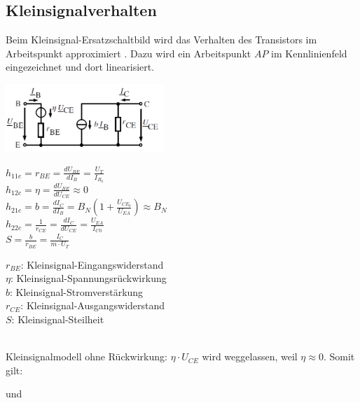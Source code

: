 	\subsection{Kleinsignalverhalten}
		Beim Kleinsignal-Ersatzschaltbild wird das Verhalten des Transistors im Arbeitspunkt
		approximiert . Dazu wird ein Arbeitspunkt $AP$ im Kennlinienfeld eingezeichnet
		und dort linearisiert. \\
		\begin{minipage}[c]{6cm}
			\includegraphics[width=6cm]{images/bip-kleinsignal}
		\end{minipage}
		\begin{minipage}[c]{6cm}
			$h_{11e} = r_{BE} = \frac{dU_{BE}}{dI_{B}} = \frac{U_T}{I_{B_0}}$ \\
			$h_{12e} = \eta = \frac{dU_{BE}}{dU_{CE}} \approx 0$ \\
			$h_{21e} = b = \frac{dI_C}{dI_B} = B_N(1+\frac{U_{CE_0}}{U_{EA}}) \approx B_N$ \\
			$h_{22e} = \frac{1}{r_{CE}} = \frac{dI_C}{dU_{CE}} = \frac{U_{EA}}{I_{C0}}$ \\
			$S = \frac{b}{r_{BE}} = \frac{I_C}{m \cdot U_T}$
		\end{minipage}
		\begin{minipage}[c]{6cm}
			$r_{BE}$: Kleinsignal-Eingangswiderstand \\
			$\eta$: Kleinsignal-Spannungsrückwirkung \\
			$b$: Kleinsignal-Stromverstärkung \\
			$r_{CE}$: Kleinsignal-Ausgangswiderstand \\
			$S$: Kleinsignal-Steilheit
		\end{minipage} \\
		Kleinsignalmodell ohne Rückwirkung: $\eta \cdot U_{CE}$ wird weggelassen, weil 
		$\eta \approx 0$. Somit gilt: \\
		\begin{center}
			 \hspace{1cm} und \hspace{1cm}
			 \\
		\end{center}
		
